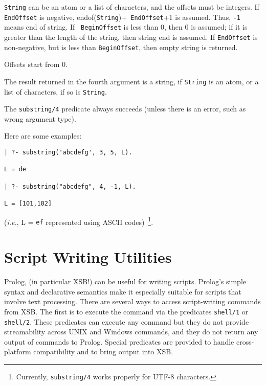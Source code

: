 \begin{description}

{\tt String} can be an atom or a list of characters, and the offsets must
be integers.  If {\tt EndOffset} is negative, endof({\tt String})+{\tt
  EndOffset}+1 is assumed. Thus, {\tt -1} means end of string.  If {\tt
  BeginOffset} is less than 0, then 0 is assumed; if it is greater than the
length of the string, then string end is assumed. If {\tt EndOffset} is
non-negative, but is less than {\tt BeginOffset}, then empty string is
returned.

Offsets start from 0.

The result returned in the fourth argument is a string, if {\tt String} is
an atom, or a list of characters, if so is {\tt String}.

The \verb|substring/4| predicate always succeeds (unless there is an error,
such as wrong argument type).

Here are some examples: 
\begin{verbatim}
| ?- substring('abcdefg', 3, 5, L).

L = de

| ?- substring("abcdefg", 4, -1, L).

L = [101,102]
\end{verbatim}
({\it i.e.}, L = {\tt ef} represented using ASCII
codes)~\footnote{Currently, {\tt substring/4} works properly for UTF-8
  characters.}.

\end{description}

\section{Script Writing Utilities}

Prolog, (in particular XSB!) can be useful for writing scripts.
Prolog's simple syntax and declarative semantics make it especially
suitable for scripts that involve text processing.  There are several
ways to access script-writing commands from XSB.  The first is to
execute the command via the predicates {\tt shell/1} or {\tt shell/2}.
These predicates can execute any command but they do not provide
streamability across UNIX and Windows commands, and they do not return
any output of commands to Prolog.  Special predicates are provided to
handle cross-platform compatibility and to bring output into XSB.

